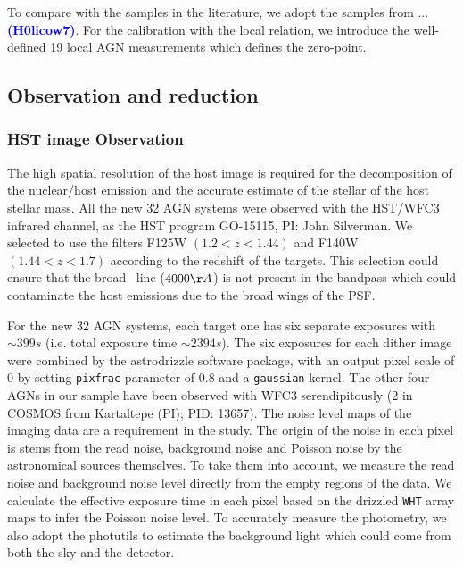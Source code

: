 \documentclass[apj]{emulateapj}
\begin{document}
To compare with the samples in the literature, we adopt the samples from ... \textcolor{blue}{\bf (H0licow7)}.
For the calibration with the local relation, we introduce the well-defined 19 local AGN measurements \citep{Ben++10, Peterson2004} which defines the zero-point. 

\subsection{Observation and reduction}
\label{observation}
\subsubsection{HST image Observation}
The high spatial resolution of the host image is required for the decomposition of the nuclear/host emission and the accurate estimate of the stellar of the host stellar mass. All the new 32 AGN systems were observed with the HST/WFC3 infrared channel, as the HST program GO-15115, PI: John Silverman. We selected to use the filters F125W $(1.2<z<1.44)$ and F140W $(1.44<z<1.7)$ according to the redshift of the targets. This selection could ensure that the broad \halpha\ line ($4000\AA$) is not present in the bandpass which could contaminate the host emissions due to the broad wings of the PSF.

For the new 32 AGN systems, each target one has six separate exposures with $\sim399s$ (i.e. total exposure time $\sim2394s$). The six exposures for each dither image were combined by the {\sc astrodrizzle} software package, with an output pixel scale of 0 by setting \texttt{pixfrac} parameter of 0.8 and a \texttt{gaussian} kernel. The other four AGNs in our sample have been observed with WFC3 serendipitously (2 in COSMOS from Kartaltepe (PI); PID: 13657).
The noise level maps of the imaging data are a requirement in the study. The origin of the noise in each pixel is stems from the read noise, background noise and Poisson noise by the astronomical sources themselves. To take them into account, we measure the read noise and background noise level directly from the empty regions of the data. We calculate the effective exposure time in each pixel based on the drizzled \texttt{WHT} array maps to infer the Poisson noise level. To accurately measure the photometry, we also adopt the {\sc photutils} to estimate the background light which could come from both the sky and the detector.
\end{document}
